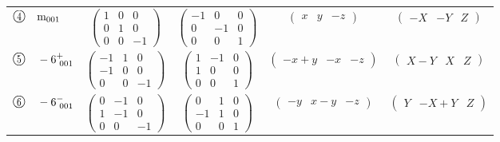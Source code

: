 \documentclass[fleqn,10pt,landscape]{jsarticle}
\begin{document}
\begin{center}
\begin{longtable}{lcccc}
$ {\ooalign{\hfil\resizebox{.8\width}{\height}{4}\hfil\crcr\raise.1ex\hbox{\large$\bigcirc$}}}\quad {\rm m}_{001} $ & $ \begin{pmatrix} 1 & 0 & 0 \\ 0 & 1 & 0 \\ 0 & 0 & -1 \end{pmatrix} $ & $ \begin{pmatrix} -1 & 0 & 0 \\ 0 & -1 & 0 \\ 0 & 0 & 1 \end{pmatrix} $ & $ \begin{pmatrix} x & y & - z \end{pmatrix} $ & $ \begin{pmatrix} - X & - Y & Z \end{pmatrix} $ \\
$ {\ooalign{\hfil\resizebox{.8\width}{\height}{5}\hfil\crcr\raise.1ex\hbox{\large$\bigcirc$}}}\quad -6^{+}_{\,\,001} $ & $ \begin{pmatrix} -1 & 1 & 0 \\ -1 & 0 & 0 \\ 0 & 0 & -1 \end{pmatrix} $ & $ \begin{pmatrix} 1 & -1 & 0 \\ 1 & 0 & 0 \\ 0 & 0 & 1 \end{pmatrix} $ & $ \begin{pmatrix} - x + y & - x & - z \end{pmatrix} $ & $ \begin{pmatrix} X - Y & X & Z \end{pmatrix} $ \\
$ {\ooalign{\hfil\resizebox{.8\width}{\height}{6}\hfil\crcr\raise.1ex\hbox{\large$\bigcirc$}}}\quad -6^{-}_{\,\,001} $ & $ \begin{pmatrix} 0 & -1 & 0 \\ 1 & -1 & 0 \\ 0 & 0 & -1 \end{pmatrix} $ & $ \begin{pmatrix} 0 & 1 & 0 \\ -1 & 1 & 0 \\ 0 & 0 & 1 \end{pmatrix} $ & $ \begin{pmatrix} - y & x - y & - z \end{pmatrix} $ & $ \begin{pmatrix} Y & - X + Y & Z \end{pmatrix} $ \\
\end{longtable}
\end{center}
\end{document}
